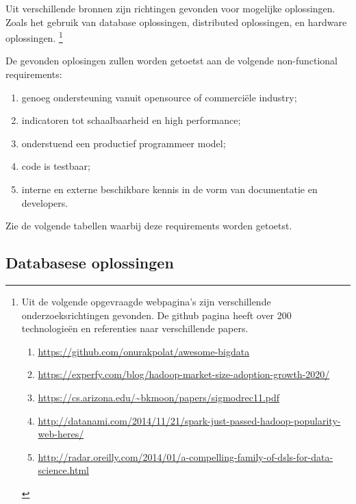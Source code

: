 Uit verschillende bronnen zijn richtingen gevonden voor mogelijke oplossingen. Zoals het gebruik van database oplossingen, distributed oplossingen, en hardware oplossingen. \footnote{
Uit de volgende opgevraagde webpagina's zijn verschillende onderzoeksrichtingen gevonden. De github pagina heeft over 200 technologieën en referenties naar verschillende papers.
\begin{enumerate}
    \item \url{https://github.com/onurakpolat/awesome-bigdata}
    \item \url{https://experfy.com/blog/hadoop-market-size-adoption-growth-2020/}
    \item \url{https://cs.arizona.edu/~bkmoon/papers/sigmodrec11.pdf}
    \item \url{http://datanami.com/2014/11/21/spark-just-passed-hadoop-popularity-web-heres/}
    \item \url{http://radar.oreilly.com/2014/01/a-compelling-family-of-dsls-for-data-science.html}
\end{enumerate}
}


De gevonden oplosingen zullen worden getoetst aan de volgende non-functional requirements:
\begin{enumerate}[label=(\alph*)]
   \item genoeg ondersteuning vanuit opensource of commerciële industry;
   \item indicatoren tot schaalbaarheid en high performance;
   \item onderstuend een productief programmeer model;
   \item code is testbaar;
   \item interne en externe beschikbare kennis in de vorm van documentatie en developers.
\end{enumerate}

Zie de volgende tabellen waarbij deze requirements worden getoetst.


\begin{comment}
Er zijn een aantal oplossingen gevonden die maximaal gebruik kunnen maken van de performance die moderne hardware te bieden heeft
- clustered databases analytics / datawarehouses (RDBMS): google bigquery, vertica, redshift, hadoopDb, Teradata
- map reduce platform: spark, hadoop, disco etc.
- Hardware, software solutions: Forge en Golang Python, MATLAB, R, Golang, Rust
\end{comment}

\newpage

\subsection{Databasese oplossingen}
\label{sec:databases}

\clearpage

